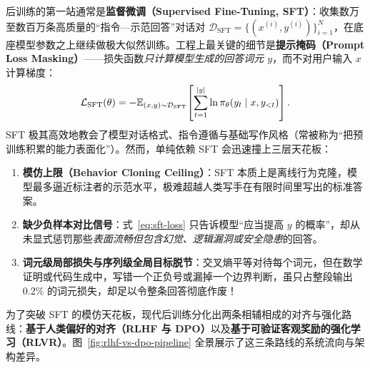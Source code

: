 后训练的第一站通常是\textbf{监督微调（Supervised Fine-Tuning, SFT）}：收集数万至数百万条高质量的“指令—示范回答”对话对 $\mathcal{D}_{\mathrm{SFT}} = \{(x^{(i)}, y^{(i)})\}_{i=1}^N$，在底座模型参数之上继续做极大似然训练。工程上最关键的细节是\textbf{提示掩码（Prompt Loss Masking）}——损失函数\emph{只计算模型生成的回答词元 $y$}，而不对用户输入 $x$ 计算梯度：
\begin{equation}
  \mathcal{L}_{\mathrm{SFT}}(\theta)
  = -\mathbb{E}_{(x, y) \sim \mathcal{D}_{\mathrm{SFT}}}\!\left[\sum_{t=1}^{|y|} \ln \pi_\theta(y_t \mid x, y_{<t})\right].
  \label{eq:sft-loss}
\end{equation}
SFT 极其高效地教会了模型对话格式、指令遵循与基础写作风格（常被称为“把预训练积累的能力表面化”）。然而，单纯依赖 SFT 会迅速撞上三层天花板：
\begin{enumerate}
  \item \textbf{模仿上限（Behavior Cloning Ceiling）}：SFT 本质上是离线行为克隆，模型最多逼近标注者的示范水平，极难超越人类写手在有限时间里写出的标准答案。
  \item \textbf{缺少负样本对比信号}：式~\eqref{eq:sft-loss} 只告诉模型“应当提高 $y$ 的概率”，却从未显式惩罚那些\emph{表面流畅但包含幻觉、逻辑漏洞或安全隐患}的回答。
  \item \textbf{词元级局部损失与序列级全局目标脱节}：交叉熵平等对待每个词元，但在数学证明或代码生成中，写错一个正负号或漏掉一个边界判断，虽只占整段输出 $0.2\%$ 的词元损失，却足以令整条回答彻底作废！
\end{enumerate}

为了突破 SFT 的模仿天花板，现代后训练分化出两条相辅相成的对齐与强化路线：\textbf{基于人类偏好的对齐（RLHF 与 DPO）}以及\textbf{基于可验证客观奖励的强化学习（RLVR）}。图~\ref{fig:rlhf-vs-dpo-pipeline} 全景展示了这三条路线的系统流向与架构差异。

